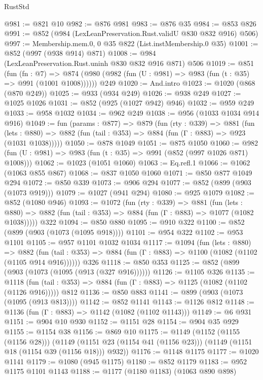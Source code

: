 \begin{lexlean}{RustStd}
\begin{coremodule}
@981 := @821 @10
@982 := @876 @981
@983 := @876 @35
@984 := @853 @826
@991 := @852 (@984 (LexLeanPreservation.Rust.validU @830 @832 @916) @506)
@997 := Membership.mem.{0, 0} @35 @822 (List.instMembership.{0} @35)
@1001 := @852 (@997 (@938 @914) @871)
@1008 := @984 (LexLeanPreservation.Rust.uninh @830 @832 @916 @871) @506
@1019 := @851
    (fun (fn : @7) =>
    @874 (@980 (@982 (fun (U : @981) => @983 (fun (t : @35) => @991 (@1001 @1008))))))
    @249
@1020 := And.intro
@1023 := @1020 (@868 (@870 @249))
@1025 := @933 (@934 @249)
@1026 := @938 @249
@1027 := @1025 @1026
@1031 := @852 (@925 (@1027 @942) @946)
@1032 := @959 @249
@1033 := @958 @1032
@1034 := @962 @249
@1038 := @956 (@1033 @1034 @914 @916)
@1049 := fun (params : @877) =>
  @879
    (fun (rty : @339) =>
    @881
      (fun (lets : @880) =>
      @882 (fun (tail : @353) => @884 (fun (Γ : @883) => @923 (@1031 @1038)))))
@1050 := @878 @1049
@1051 := @875 @1050
@1060 := @982 (fun (U : @981) => @983 (fun (t : @35) => @991 (@852 (@997 @1026 @871) @1008)))
@1062 := @1023 (@1051 @1060)
@1063 := Eq.refl.{1}
@1066 := @1062 (@1063 @855 @867)
@1068 := @837 @1050 @1060
@1071 := @850 @877 @1049 @294
@1072 := @850 @339
@1073 := @906 @294
@1077 := @852 (@899 (@903 (@1073 @919)))
@1079 := @1027 (@941 @294)
@1080 := @925 @1079
@1082 := @852 (@1080 @946)
@1093 := @1072
    (fun (rty : @339) =>
    @881
      (fun (lets : @880) =>
      @882 (fun (tail : @353) => @884 (fun (Γ : @883) => @1077 (@1082 @1038)))))
    @322
@1094 := @850 @880
@1095 := @910 @322
@1100 := @852 (@899 (@903 (@1073 (@1095 @918))))
@1101 := @954 @322
@1102 := @953 @1101
@1105 := @957 @1101 @1032 @1034
@1117 := @1094
    (fun (lets : @880) =>
    @882 (fun (tail : @353) => @884 (fun (Γ : @883) => @1100 (@1082 (@1102 (@1105 @914 @916))))))
    @326
@1118 := @850 @353
@1125 := @852 (@899 (@903 (@1073 (@1095 (@913 (@327 @916))))))
@1126 := @1105 @326
@1135 := @1118
    (fun (tail : @353) => @884 (fun (Γ : @883) => @1125 (@1082 (@1102 (@1126 @916)))))
    @812
@1136 := @850 @883
@1141 := @899 (@903 (@1073 (@1095 (@913 @813))))
@1142 := @852 @1141
@1143 := @1126 @812
@1148 := @1136 (fun (Γ : @883) => @1142 (@1082 (@1102 @1143)))
@1149 := @6 @931
@1151 := @904 @10 @930
@1152 := @1151 @28
@1154 := @904 @35 @929
@1155 := @1154 @38
@1156 := @869 @10
@1175 := @1149
    (@1152 (@1155 (@1156 @28)))
    (@1149 (@1151 @23 (@1154 @41 (@1156 @23))) (@1149 (@1151 @18 (@1154 @39 (@1156 @18))) @932))
@1176 := @1148 @1175
@1177 := @1020 @1141
@1179 := @1080 (@945 @1175)
@1180 := @852 @1179
@1183 := @952 @1175 @1101 @1143
@1188 := @1177 (@1180 @1183) (@1063 @890 @898)

\end{coremodule}
\end{lexlean}
